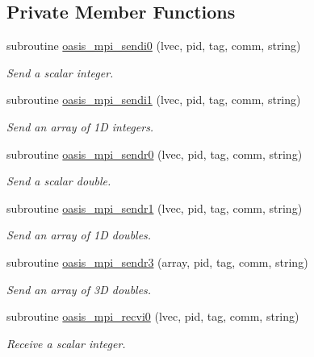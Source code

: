 \subsection*{Private Member Functions}
\begin{DoxyCompactItemize}
\item 
subroutine \hyperlink{classmod__oasis__mpi_aa5078962eee157f52878f711c0a29afb}{oasis\+\_\+mpi\+\_\+sendi0} (lvec, pid, tag, comm, string)
\begin{DoxyCompactList}\small\item\em Send a scalar integer. \end{DoxyCompactList}\item 
subroutine \hyperlink{classmod__oasis__mpi_aab4cc0d2b50e8e73697e6d88d23b03cd}{oasis\+\_\+mpi\+\_\+sendi1} (lvec, pid, tag, comm, string)
\begin{DoxyCompactList}\small\item\em Send an array of 1\+D integers. \end{DoxyCompactList}\item 
subroutine \hyperlink{classmod__oasis__mpi_ab38f15fbce57555ea66ccbc1aa477dd1}{oasis\+\_\+mpi\+\_\+sendr0} (lvec, pid, tag, comm, string)
\begin{DoxyCompactList}\small\item\em Send a scalar double. \end{DoxyCompactList}\item 
subroutine \hyperlink{classmod__oasis__mpi_a948cd001c0955ae19f4b410d4cca9f9b}{oasis\+\_\+mpi\+\_\+sendr1} (lvec, pid, tag, comm, string)
\begin{DoxyCompactList}\small\item\em Send an array of 1\+D doubles. \end{DoxyCompactList}\item 
subroutine \hyperlink{classmod__oasis__mpi_ac8809a8b29b3ffa246612b9c25cd05eb}{oasis\+\_\+mpi\+\_\+sendr3} (array, pid, tag, comm, string)
\begin{DoxyCompactList}\small\item\em Send an array of 3\+D doubles. \end{DoxyCompactList}\item 
subroutine \hyperlink{classmod__oasis__mpi_ad89796f10a2225d4930cdec65546cf98}{oasis\+\_\+mpi\+\_\+recvi0} (lvec, pid, tag, comm, string)
\begin{DoxyCompactList}\small\item\em Receive a scalar integer. \end{DoxyCompactList}\item 

\end{DoxyCompactItemize}
